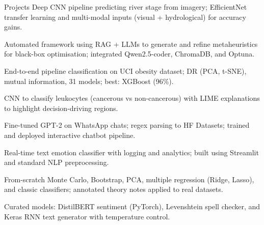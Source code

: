 \begin{rubricnorepeat}{Projects}
Deep CNN pipeline predicting river stage from imagery; EfficientNet transfer learning and multi-modal inputs (visual + hydrological) for accuracy gains.\hfill \href{https://github.com/musel25/research_deep_learning}{\faGithub}

Automated framework using RAG + LLMs to generate and refine metaheuristics for black-box optimisation; integrated Qwen2.5-coder, ChromaDB, and Optuna.\hfill \href{https://github.com/musel25/llm-metaheuristics}{\faGithub}

End-to-end pipeline classification on UCI obesity dataset; DR (PCA, t-SNE), mutual information, 31 models; best: XGBoost (96\%).\hfill \href{https://github.com/musel25/obesity_ml}{\faGithub}

CNN to classify leukocytes (cancerous vs non-cancerous) with LIME explanations to highlight decision-driving regions.

Fine-tuned GPT-2 on WhatsApp chats; regex parsing to HF Datasets; trained and deployed interactive chatbot pipeline.\hfill \href{https://github.com/musel25/her_if_it_was_2025}{\faGithub}

Real-time text emotion classifier with logging and analytics; built using Streamlit and standard NLP preprocessing.\hfill \href{https://github.com/musel25/nlp_project}{\faGithub}

From-scratch Monte Carlo, Bootstrap, PCA, multiple regression (Ridge, Lasso), and classic classifiers; annotated theory notes applied to real datasets.
\hfill 
\href{https://github.com/musel25/Advanced_Machine_Learning}{\faGithub}

Curated models: DistilBERT sentiment (PyTorch), Levenshtein spell checker, and Keras RNN text generator with temperature control.
\hfill 
\href{https://github.com/musel25/nlp_projects}{\faGithub}

\end{rubricnorepeat}
